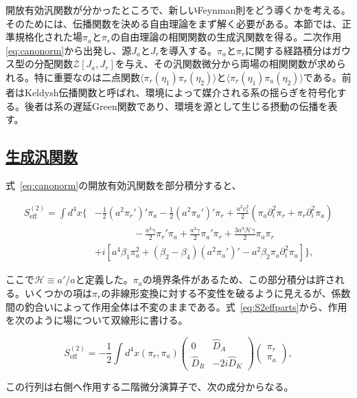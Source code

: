 \documentclass[a4paper,11pt]{ltjsarticle}
\newcommand{\subsectionlink}[1]{\subsection[#1]{\hyperlink{toc}{#1}}}
\numberwithin{equation}{section}
\def\pia{\pi_{a}}
\def\pir{\pi_{r}}
\newcommand{\Eq}[1]{Eq.~(\ref{#1})}
\renewcommand{\Eq}[1]{式~\eqref{#1}}
\begin{document}
開放有効汎関数が分かったところで、新しいFeynman則をどう導くかを考える。そのためには、伝播関数を決める自由理論をまず解く必要がある。本節では、正準規格化された場$\pia$と$\pir$の自由理論の相関関数の生成汎関数を得る。二次作用\eqref{eq:canonorm}から出発し、源$J_a$と$J_r$を導入する。$\pia$と$\pir$に関する経路積分はガウス型の分配関数$\mathcal{Z}[J_a,J_r]$を与え、その汎関数微分から両場の相関関数が求められる。特に重要なのは二点関数$\langle\pir(\eta_1)\pir(\eta_2)\rangle$と$\langle\pir(\eta_1)\pia(\eta_2)\rangle$である。前者はKeldysh伝播関数と呼ばれ、環境によって媒介される系の揺らぎを符号化する\cite{kamenev_2011}。後者は系の遅延Green関数であり、環境を源として生じる摂動の伝播を表す。

\subsectionlink{生成汎関数}

\Eq{eq:canonorm}の開放有効汎関数を部分積分すると、

\begin{align}
S_{\text{eff}}^{(2)} =\int d^{4}x\bigg\{&-\frac{1}{2}\left(a^{2}\pir'\right)' \pia-\frac{1}{2} \left(a^{2}\pia'\right)' \pir+\frac{a^2 c_s^2}{2} \left(\pia\partial_{i}^{2}\pir+\pir\partial_{i}^{2}\pia\right)\nonumber\\
&\qquad \qquad -\frac{a^3\gamma}{2}\pir'\pia+\frac{a^3\gamma}{2}\pia'\pir+\frac{3a^3\mathcal{H}\gamma}{2} \pia\pir\nonumber\\
&+i \left[a^4\beta_1  \pia^2 + \left(\beta_2 - \beta_4\right)\left(a^{2}\pia'\right)' - a^2\beta_2 \pia\partial_i^{2} \pia \right]\bigg\},\label{eq:S2effparts}
\end{align}

ここで$\mathcal{H}\equiv a'/a$と定義した。$\pia$の境界条件があるため、この部分積分は許される。いくつかの項は$\pir$の非線形変換に対する不変性を破るように見えるが、係数間の釣合いによって作用全体は不変のままである。\Eq{eq:S2effparts}から、作用を次のように場について双線形に書ける。

\begin{equation}
S_{\text{eff}}^{(2)} = -\frac{1}{2}\int d^{4}x \left(\pir,\pia\right)\begin{pmatrix}
0 & \widehat{D}_{A} \\ \widehat{D}_{R} & -2i\widehat{D}_{K}
\end{pmatrix}\begin{pmatrix}
\pir \\ \pia
\end{pmatrix},
\end{equation}

この行列は右側へ作用する二階微分演算子で、次の成分からなる。
\end{document}
